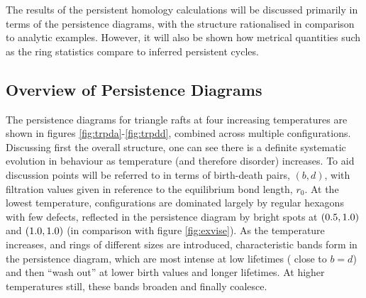 The results of the persistent homology calculations will be discussed primarily in terms of the persistence diagrams, with the structure rationalised in comparison to analytic examples. 
However, it will also be shown how metrical quantities such as the ring statistics compare to inferred persistent cycles.

\subsection{Overview of Persistence Diagrams}

The persistence diagrams for triangle rafts at four increasing temperatures are shown in figures \ref{fig:trpda}\--\ref{fig:trpdd}, combined across multiple configurations.
Discussing first the overall structure, one can see there is a definite systematic evolution in behaviour as temperature (and therefore disorder) increases.
To aid discussion points will be referred to in terms of birth\--death pairs, $\left(b,d\right)$, with filtration values given in reference to the equilibrium bond length, $r_0$.
At the lowest temperature, configurations are dominated largely by regular hexagons with few defects, reflected in the persistence diagram by bright spots at $\left(0.5,1.0\right)$ and $\left(1.0,1.0\right)$ (in comparison with figure \ref{fig:exvise}).
As the temperature increases, and rings of different sizes are introduced, characteristic bands form in the persistence diagram, which are most intense at low lifetimes (\ie{} close to $b=d$) and then ``wash out'' at lower birth values and longer lifetimes. 
At higher temperatures still, these bands broaden and finally coalesce.

